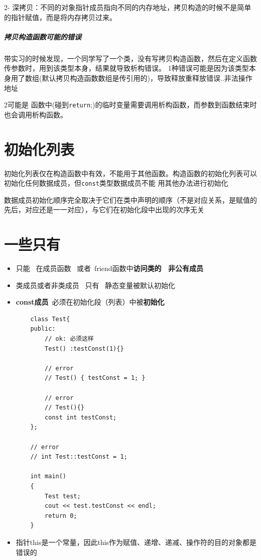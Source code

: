 \documentclass[UTF8,a4paper,12pt]{ctexbook} %
\begin{document}
		       2- 深拷贝：不同的对象指针成员指向不同的内存地址，拷贝构造的时候不是简单的指针赋值，而是将内存拷贝过来。
		       
		       \subparagraph{拷贝构造函数可能的错误}
				     带实习的时候发现，一个同学写了一个类，没有写拷贝构造函数，然后在定义函数传参数时，用到该类型本身，结果就导致析构错误。 1种错误可能是因为该类型本身用了数组(默认拷贝构造函数数组是传引用的)，导致释放重释放错误..非法操作地址
				     
				     2可能是 函数中(碰到\verb|return|;)的临时变量需要调用析构函数，而参数到函数结束时也会调用析构函数。
		       
\section{初始化列表}
	       
		       初始化列表仅在构造函数中有效，不能用于其他函数。构造函数的初始化列表可以初始化任何数据成员，但\verb|const|类型数据成员不能 用其他办法进行初始化
		       
		       数据成员初始化顺序完全取决于它们在类中声明的顺序（不是对应关系，是赋值的先后，对应还是一一对应），与它们在初始化段中出现的次序无关
		       
	       
\section{一些只有}
	       \begin{itemize}
		       \item 只能 \ 在成员函数 \ 或者\ friend函数中\textbf{访问类的 \ 非公有成员}
		       
		       \item 类成员或者非类成员  \   只有  \   静态变量被默认初始化
		       
		       \item \textbf{const成员}\ 必须在初始化段（列表）中被\textbf{初始化}
\begin{lstlisting}
	class Test{
	public:
		// ok: 必须这样
		Test() :testConst(1){}
		
		// error
		// Test() { testConst = 1; }
		
		// error
		// Test(){}
		const int testConst;
	};
	
	// error
	// int Test::testConst = 1;
	
	int main()
	{
		Test test;
		cout << test.testConst << endl;
		return 0;
	}
\end{lstlisting}

		       \item 指针this是一个常量，因此this作为赋值、递增、递减、操作符的目的对象都是错误的
		    \end{itemize}
	       
\end{document}
